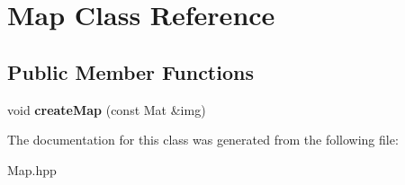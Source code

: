 \hypertarget{class_map}{}\section{Map Class Reference}
\label{class_map}
\subsection*{Public Member Functions}
\begin{DoxyCompactItemize}
\item 
\mbox{\label{class_map_a02537656e91e97077dfdfc5d84c3027b}} 
void {\bfseries create\+Map} (const Mat \&img)
\end{DoxyCompactItemize}


The documentation for this class was generated from the following file\+:\begin{DoxyCompactItemize}
\item 
Map.\+hpp\end{DoxyCompactItemize}
